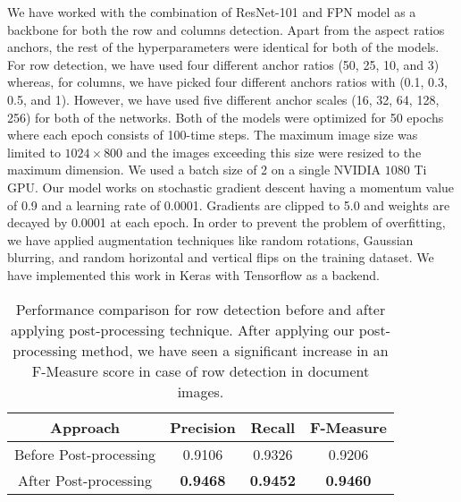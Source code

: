 \documentclass{ieeeaccess}
\begin{document}
We have worked with the combination of ResNet-101 \cite{b49} and FPN\cite{b50} model as a backbone for both the row and columns detection. Apart from the aspect ratios anchors, the rest of the hyperparameters were identical for both of the models. For row detection, we have used four different anchor ratios (50, 25, 10, and 3) whereas, for columns, we have picked four different anchors ratios with (0.1, 0.3, 0.5, and 1). However, we have used five different anchor scales (16, 32, 64, 128, 256) for both of the networks. Both of the models were optimized for 50 epochs where each epoch consists of 100-time steps. The maximum image size was limited to $1024 \times 800$ and the images exceeding this size were resized to the maximum dimension. We used a batch size of 2 on a single NVIDIA $1080$ Ti GPU. Our model works on stochastic gradient descent having a momentum value of 0.9 and a learning rate of 0.0001. Gradients are clipped to 5.0 and weights are decayed by 0.0001 at each epoch. In order to prevent the problem of overfitting, we have applied augmentation techniques like random rotations, Gaussian blurring, and random horizontal and vertical flips on the training dataset. We have implemented this work in Keras \cite{b53} with Tensorflow \cite{b54} as a backend.


\begin{table}
    \centering
    \normalsize
    \setlength\tabcolsep{5pt} 
    \setlength\extrarowheight{5pt}
\begin{tabular}{ |c|c|c|c| } 
    \hline
    \normalsize {Approach} &
    \normalsize  {Precision}&
    \normalsize  {Recall}&
    \normalsize  {F-Measure} \\
    \hline
    \small {Before Post-processing} &
    \small  {0.9106}&
    \small  {0.9326}&
    \small {0.9206} \\
    \hline
    \small {After Post-processing} &
    \small  \textbf{{0.9468}}&
    \small  \textbf{{0.9452}}&
    \small \textbf{{0.9460}} \\
    \hline
\end{tabular}
    \caption{Performance comparison for row detection before and after applying post-processing technique. After applying our post-processing method, we have seen a significant increase in an F-Measure score in case of row detection in document images.}
    \label{tab:post_process_results}
\end{table}




\newcolumntype{d}{X}
\end{document}
